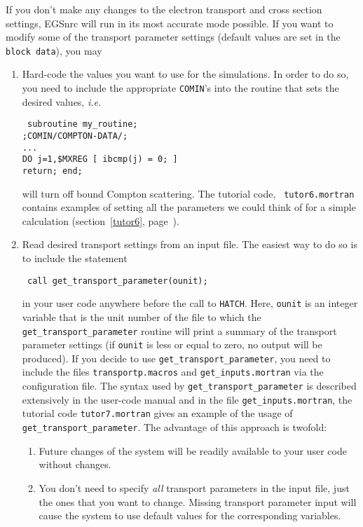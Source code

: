 If you don't make any changes to the electron transport
and cross section settings, EGSnrc will run in its
most accurate mode possible. If you want
to modify some of the transport parameter settings (default values
are set in the {\tt block data}), you may
\begin{enumerate}
\item
Hard-code the values you want to use for the simulations.
In order to do so, you need to include the appropriate
{\tt COMIN}'s into the routine that sets
the desired values, {\em i.e.}
\begin{flushleft}{\tt
subroutine my\_routine; \\
;COMIN/COMPTON-DATA/; \\
...\\
DO j=1,\$MXREG [ ibcmp(j) = 0; ] \\
return; end; }
\end{flushleft}
will turn off bound Compton scattering.  The tutorial code, {\tt
tutor6.mortran} contains examples of setting all the parameters we could
think of for a simple calculation (section~\ref{tutor6},
page~\pageref{tutor6}).
\item
Read desired transport settings from an input file.
The easiest way to do so is to include  the statement
\begin{flushleft} {\tt
call get\_transport\_parameter(ounit); }
\end{flushleft}
in your user code anywhere before the call to {\tt HATCH}.
Here, {\tt ounit} is an integer variable that is
the unit number of the file to which the
{\tt get\_transport\_parameter} routine will print a summary of
the transport parameter settings (if {\tt ounit} is less
or equal to zero, no output will be produced).
If you decide to use {\tt get\_transport\_parameter}, you need
to include the files {\tt transportp.macros} and
{\tt get\_inputs.mortran} via the
configuration file. The syntax used by {\tt get\_transport\_parameter}
is described extensively in the user-code manual\cite{Ro00} and in the file
{\tt get\_inputs.mortran}, the tutorial code
{\tt tutor7.mortran} gives an example of the usage of
{\tt get\_transport\_parameter}.
The advantage of this approach is twofold:
\begin{enumerate}
\item
Future changes of the system will be readily
available to your user code without changes.
\item
You don't need to specify {\em all} transport
parameters in the input file, just the ones
that you want to change. Missing transport
parameter input will cause the system
to use default values for the corresponding variables.
\end{enumerate}
\end{enumerate}


